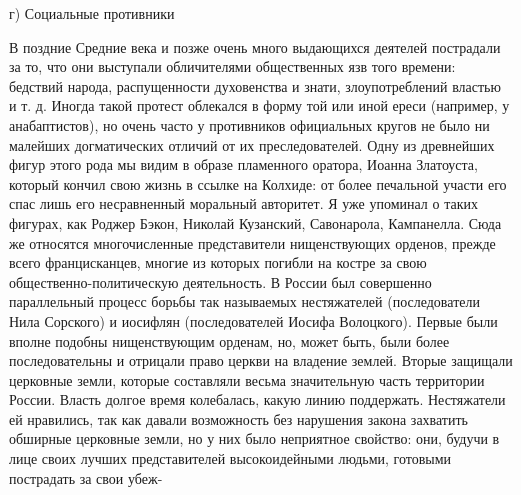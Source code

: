 г) Социальные противники

В поздние Средние века и позже очень много выдающихся деятелей пострадали за
то, что они выступали обличителями общественных язв того времени: бедствий
народа, распущенности духовенства и знати, злоупотреблений властью и т. д.
Иногда такой протест облекался в форму той или иной ереси (например, у
анабаптистов), но очень часто у противников официальных кругов не было ни
малейших догматических отличий от их преследователей. Одну из древнейших фигур
этого рода мы видим в образе пламенного оратора, Иоанна Златоуста, который
кончил свою жизнь в ссылке на Колхиде: от более печальной участи его спас лишь
его несравненный моральный авторитет. Я уже упоминал о таких фигурах, как
Роджер Бэкон, Николай Кузанский, Савонарола, Кампанелла. Сюда же относятся
многочисленные представители нищенствующих орденов, прежде всего францисканцев,
многие из которых погибли на костре за свою общественно-политическую
деятельность. В России был совершенно параллельный процесс борьбы так
называемых нестяжателей (последователи Нила Сорского) и иосифлян
(последователей Иосифа Волоцкого). Первые были вполне подобны нищенствующим
орденам, но, может быть, были более последовательны и отрицали право церкви на
владение землей. Вторые защищали церковные земли, которые составляли весьма
значительную часть территории России. Власть долгое время колебалась, какую
линию поддержать. Нестяжатели ей нравились, так как давали возможность без
нарушения закона захватить обширные церковные земли, но у них было неприятное
свойство: они, будучи в лице своих лучших представителей высокоидейными людьми,
готовыми пострадать за свои убеж-
